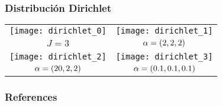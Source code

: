 \documentclass[table]{beamer}
\begin{document}
\begin{frame}
    \frametitle{Distribución Dirichlet}
    \begin{center}
        \begin{tabular}{cc}
            \texttt{[image: dirichlet\_0]} &
            \texttt{[image: dirichlet\_1]} \\
            $J = 3$ & $\mathbf{\alpha} = \parens{2, 2, 2}$ \\
            \texttt{[image: dirichlet\_2]} &
            \texttt{[image: dirichlet\_3]} \\
            $\mathbf{\alpha} = \parens{20, 2, 2}$ &
            $\mathbf{\alpha} = \parens{0.1, 0.1, 0.1}$
        \end{tabular}
    \end{center}
\end{frame}

\begin{frame}
\frametitle<presentation>{References}
\printbibliography
%
\end{frame}
\fi
\end{document}
